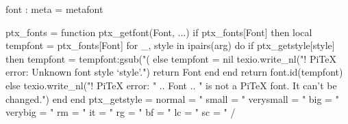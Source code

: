 \setparameter font :
  meta = metafont

\newdimen\ptx@fontsize
\luacode
ptx_fonts = {}
function ptx_getfont(Font, ...)
  if ptx_fonts[Font] then
    local tempfont = ptx_fonts[Font]
    for _, style in ipairs(arg) do
      if ptx_getstyle[style] then
        tempfont = tempfont:gsub("(%
      else
        tempfont = nil
        texio.write_nl("! PiTeX error: Unknown font style `style'.")
        return Font
      end
    end
    return font.id(tempfont)
  else
    texio.write_nl("! PiTeX error: " .. Font .. " is not a PiTeX font. It can't be changed.")
  end
end
ptx_getstyle = {
  normal    = "%
  small     = "%
  verysmall = "%
  big       = "%
  verybig   = "%
  rm        = "%
  it        = "%
  rg        = "%
  bf        = "%
  lc        = "%
  sc        = "%
  }
\luacode/

\newstring{+} \newstring{-}
\def\ptx@dofont#1#2#3#4#5{%
  \edef\ptx@temp{\passvaluenobraces\commandtoname font : command }%
  \ifexpression{ -\ifstring{#4}{normal} & { \ifprefix-{#5} | \ifprefix+{#5} } }
     {\def\ptx@dofont_size{\dimexpr\usevalue font : size + #5\relax}}
     {\def\ptx@dofont_size{#5}}%
  \ptx@dofont_load{\ptx@temp @#4@#1@#2@lc}{#3}{}{\ptx@dofont_size}%
  \ifstring{#1}{rm}
    {\ptx@dofont_load{\ptx@temp @#4@#1@#2@sc}{#3}{+smcp;}{\ptx@dofont_size}%
     \ifattribute font : slant %
       {\ptx@dofont_load{\ptx@temp @#4@it@#2@lc}{#3}{slant=\usevalue font: slant ;}{\ptx@dofont_size}
        \ifattribute font : slantsc {}
          {\ptx@dofont_load{\ptx@temp @#4@it@#2@sc}{#3}{+smcp;slant=\usevalue font: slant ;}{\ptx@dofont_size}}}{}%
     \ifattribute font : slantsc
       {\ptx@dofont_load{\ptx@temp @#4@it@#2@sc}{#3}{+smcp;slant=\usevalue font: slantsc ;}{\ptx@dofont_size}}{}}%
    {\ifattribute font : slantsc {}{\ptx@dofont_load{\ptx@temp @#4@it@#2@sc}{#3}{+smcp;}{\ptx@dofont_size}}}
  }

\def\ptx@dofont_load#1#2#3#4{%
  \passcs\font{#1}="\usevalue font : name #2:#3\usevalue font : features " at #4\relax
  \ptx@lua{ptx_fonts[font.id("#1")] = "#1"}%
  }



